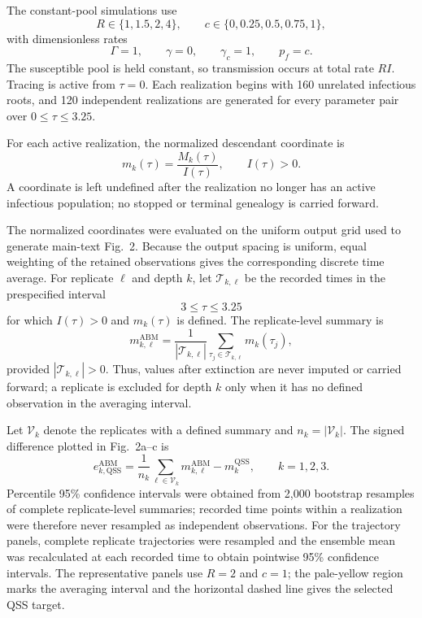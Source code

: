 \documentclass[11pt]{article}
\newcommand{\ABM}{\mathrm{ABM}}
\begin{document}
The constant-pool simulations use
\begin{equation}
R\in\{1,1.5,2,4\},\qquad c\in\{0,0.25,0.5,0.75,1\},
\end{equation}
with dimensionless rates
\begin{equation}
\Gamma=1,\qquad \gamma=0,\qquad \gamma_c=1,\qquad p_f=c.
\end{equation}
The susceptible pool is held constant, so transmission occurs at total rate $RI$. Tracing is active from $\tau=0$. Each realization begins with 160 unrelated infectious roots, and 120 independent realizations are generated for every parameter pair over $0\leq\tau\leq3.25$.

For each active realization, the normalized descendant coordinate is
\begin{equation}
m_k(\tau)=\frac{M_k(\tau)}{I(\tau)},\qquad I(\tau)>0.
\end{equation}
A coordinate is left undefined after the realization no longer has an active infectious population; no stopped or terminal genealogy is carried forward.

The normalized coordinates were evaluated on the uniform output grid used to generate main-text Fig.~2. Because the output spacing is uniform, equal weighting of the retained observations gives the corresponding discrete time average. For replicate $\ell$ and depth $k$, let $\mathcal T_{k,\ell}$ be the recorded times in the prespecified interval
\begin{equation}
3\leq\tau\leq3.25
\end{equation}
for which $I(\tau)>0$ and $m_k(\tau)$ is defined. The replicate-level summary is
\begin{equation}
m_{k,\ell}^{\ABM}=\frac{1}{|\mathcal T_{k,\ell}|}\sum_{\tau_j\in\mathcal T_{k,\ell}}m_k(\tau_j),
\end{equation}
provided $|\mathcal T_{k,\ell}|>0$. Thus, values after extinction are never imputed or carried forward; a replicate is excluded for depth $k$ only when it has no defined observation in the averaging interval.

Let $\mathcal V_k$ denote the replicates with a defined summary and $n_k=|\mathcal V_k|$. The signed difference plotted in Fig.~2a--c is
\begin{equation}
e^{\ABM}_{k,\mathrm{QSS}}=\frac{1}{n_k}\sum_{\ell\in\mathcal V_k}m_{k,\ell}^{\ABM}-m_k^{\mathrm{QSS}},
\qquad k=1,2,3.
\end{equation}
Percentile 95\% confidence intervals were obtained from 2,000 bootstrap resamples of complete replicate-level summaries; recorded time points within a realization were therefore never resampled as independent observations. For the trajectory panels, complete replicate trajectories were resampled and the ensemble mean was recalculated at each recorded time to obtain pointwise 95\% confidence intervals. The representative panels use $R=2$ and $c=1$; the pale-yellow region marks the averaging interval and the horizontal dashed line gives the selected QSS target.
\end{document}
